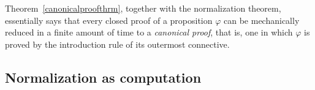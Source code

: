 Theorem~\ref{canonicalproofthrm}, together with the normalization theorem,
essentially says that every closed proof of a proposition $\varphi$ can be
mechanically reduced in a finite amount of time to a \emph{canonical proof},
that is, one in which $\varphi$ is proved by the introduction rule of its
outermost connective.

\subsection{Normalization as computation}

